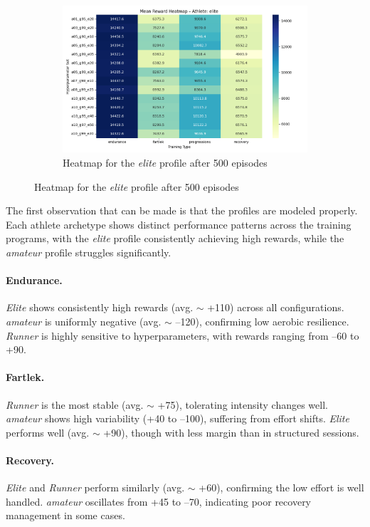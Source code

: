 \begin{figure}
\begin{subfigure}[t]{0.75\textwidth}
        \centering
        \includegraphics[width=\textwidth]{images/analysis_outputs_500/heatmap_elite_500.png}
        \caption{Heatmap for the \textit{elite} profile after 500 episodes}
    \label{fig:elite-500}
    \end{subfigure}
\end{figure}

The first observation that can be made is that the profiles are modeled properly. Each athlete archetype shows distinct performance patterns across the training programs, with the \textit{elite} profile consistently achieving high rewards, while the \textit{amateur} profile struggles significantly.

\paragraph{Endurance.}
\textit{Elite} shows consistently high rewards (avg. $\sim$ +110) across all configurations. \textit{amateur} is uniformly negative (avg. $\sim$ –120), confirming low aerobic resilience. \textit{Runner} is highly sensitive to hyperparameters, with rewards ranging from –60 to +90.

\paragraph{Fartlek.}
\textit{Runner} is the most stable (avg. $\sim$ +75), tolerating intensity changes well. \textit{amateur} shows high variability (+40 to –100), suffering from effort shifts. \textit{Elite} performs well (avg. $\sim$ +90), though with less margin than in structured sessions.

\paragraph{Recovery.}
\textit{Elite} and \textit{Runner} perform similarly (avg. $\sim$ +60), confirming the low effort is well handled. \textit{amateur} oscillates from +45 to –70, indicating poor recovery management in some cases.

